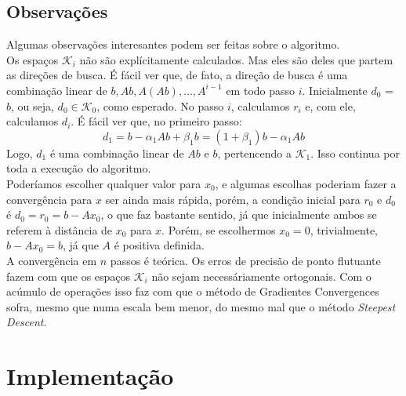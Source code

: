 \documentclass[
10pt, %
a4paper, %
oneside, %
headinclude,footinclude, %
BCOR5mm, %
]{scrartcl}
\begin{document}
\subsection{Observações}
Algumas observações interesantes podem ser feitas sobre o algoritmo. \\
Os espaços $\mathcal{K}_i$ não são explícitamente calculados. Mas eles são deles que partem as direções de busca. É fácil ver que, de fato, a direção de busca é uma combinação linear de $b, Ab, A(Ab), \dots, A^{i-1}$ em todo passo $i$. Inicialmente $d_0$ = $b$, ou seja, $d_0 \in \mathcal{K}_0$, como esperado. No passo $i$, calculamos $r_i$ e, com ele, calculamos $d_i$. É fácil ver que, no primeiro passo:
$$ d_1 = b - \alpha_1 Ab + \beta_1 b = (1+\beta_1)b - \alpha_1 Ab $$
Logo, $d_1$ é uma combinação linear de $Ab$ e $b$, pertencendo a $\mathcal{K}_1$. Isso continua por toda a execução do algoritmo. \\
Poderíamos escolher qualquer valor para $x_0$, e algumas escolhas poderiam fazer a convergência para $x$ ser ainda mais rápida, porém, a condição inicial para $r_0$ e $d_0$ é $d_0 = r_0 = b - Ax_0$, o que faz bastante sentido, já que inicialmente ambos se referem à distância de $x_0$ para $x$. Porém, se escolhermos $x_0 = 0$, trivialmente, $b - Ax_0 = b$, já que $A$ é positiva definida. \\
A convergência em $n$ passos é teórica. Os erros de precisão de ponto flutuante fazem com que os espaços $\mathcal{K}_i$ não sejam necessáriamente ortogonais. Com o acúmulo de operações isso faz com que o método de Gradientes Convergences sofra, mesmo que numa escala bem menor, do mesmo mal que o método \textit{Steepest Descent}.

\section{Implementação}
\end{document}
